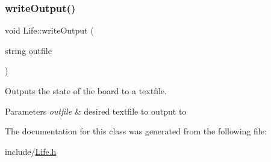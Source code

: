 \subsubsection{\texorpdfstring{write\+Output()}{writeOutput()}}
{\footnotesize\ttfamily void Life\+::write\+Output (\begin{DoxyParamCaption}\item[{string}]{outfile }\end{DoxyParamCaption})}



Outputs the state of the board to a textfile. 


\begin{DoxyParams}{Parameters}
{\em outfile} & desired textfile to output to \\
\hline
\end{DoxyParams}


The documentation for this class was generated from the following file\+:\begin{DoxyCompactItemize}
\item 
include/\hyperlink{_life_8h}{Life.\+h}\end{DoxyCompactItemize}
